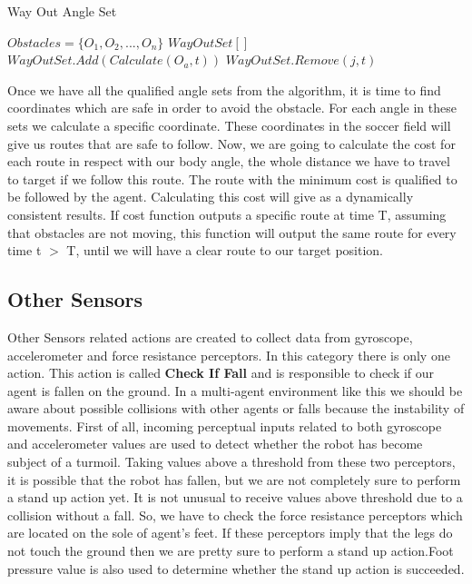 \begin{algorithm}[htb!]
\caption{Way Out Angle Set}
\label{AngleSet}
\begin{algorithmic}[1]
$Obstacles = \lbrace O_{1},O_{2},...,O_{n} \rbrace $
$WayOutSet[ ]$
\STATE $WayOutSet.Add(Calculate(O_{a},t))$
\ENDFOR
{}
\STATE $WayOutSet.Remove(j,t)$
\ENDIF
\ENDFOR
\ENDFOR
\end{algorithmic}
\end{algorithm}
Once we have all the qualified angle sets from the algorithm, it is time to find coordinates which are safe in order to avoid the obstacle. For each angle in these sets we calculate a specific coordinate. These coordinates in the soccer field will give us routes that are safe to follow. Now, we are going to calculate the cost for each route in respect with our body angle, the whole distance we have to travel to target if we follow this route. The route with the minimum cost is qualified to be followed by the agent. Calculating this cost will give as a dynamically consistent results. If cost function outputs a specific route at time T, assuming that obstacles are not moving, this function will output the same route for every time t $>$ T, until we will have a clear route to our target position.


\subsection{Other Sensors}
Other Sensors related actions are created to collect data from gyroscope, accelerometer and force resistance perceptors. In this category there is only one action. This action is called {\bf Check If Fall} and is responsible to check if our agent is fallen on the ground. In a multi-agent environment like this we should be aware about possible collisions with other agents or falls because the instability of movements. First of all, incoming perceptual inputs related to both gyroscope and accelerometer values are used to detect whether the robot has become subject of a turmoil. Taking values  above a threshold from these two perceptors, it is possible that the robot has fallen, but we are not completely sure to perform a stand up action yet. It is not unusual to receive values above threshold due to a collision without a fall. So, we have to check the force resistance perceptors which are located on the sole of agent's feet. If these perceptors imply that the legs do not touch the ground then we are pretty sure to perform a stand up action.Foot pressure value is also used to determine whether the stand up action is succeeded.


